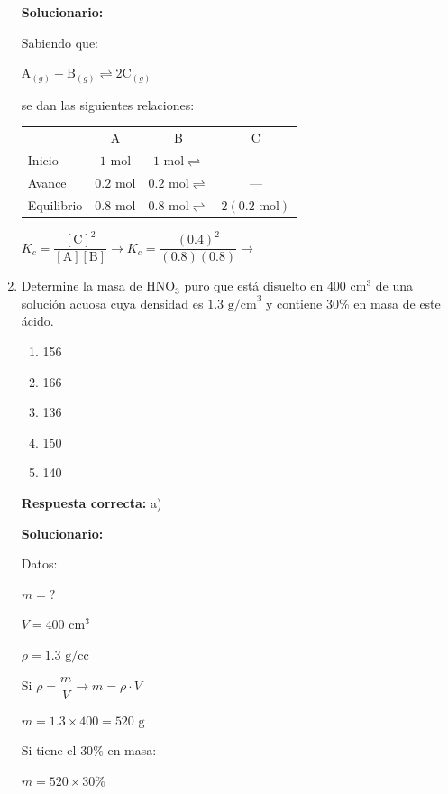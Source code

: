 \begin{enumerate}[resume]
	\vspace{2mm}
	\textbf{Solucionario:}

	Sabiendo que:

	$\text{A}_{(g)} + \text{B}_{(g)} \rightleftharpoons 2\text{C}_{(g)}$

	se dan las siguientes relaciones:

	\begin{center}
		\begin{tabular}{lccc}
			& A & B & C \\
			Inicio & $1\text{ mol}$ & $1\text{ mol}  \rightleftharpoons $ & --- \\
			Avance & $0.2\text{ mol}$ & $0.2\text{ mol}  \rightleftharpoons$ & --- \\
			Equilibrio & $0.8\text{ mol}$ & $0.8\text{ mol} \rightleftharpoons$ & $2(0.2\text{ mol})$
		\end{tabular}
	\end{center}

	$ K_c = \dfrac{[\text{C}]^2}{[\text{A}][\text{B}]} \rightarrow K_c = \dfrac{(0.4)^2}{(0.8)(0.8)} \rightarrow$ 

	\vspace{6mm}

	\item Determine la masa de $\text{HNO}_3$ puro que está disuelto en $400\text{ cm}^3$ de una solución acuosa cuya densidad es $1.3\text{ g/cm}^3$ y contiene $30\%$ en masa de este ácido.
	\begin{enumerate}[label=\alph*)]
		\item 156
		\item 166
		\item 136
		\item 150
		\item 140
	\end{enumerate}
	\textbf{Respuesta correcta:} a)

	\vspace{2mm}
	\textbf{Solucionario:}

	Datos:

	$m = ?$

	$V = 400\text{ cm}^3$

	$\rho = 1.3\text{ g/cc}$

	Si $\rho = \dfrac{m}{V} \rightarrow m = \rho \cdot V$

	$ m = 1.3 \times 400 = 520\text{ g} $

	Si tiene el $30\%$ en masa:

	$ m = 520 \times 30\% $


\end{enumerate}

